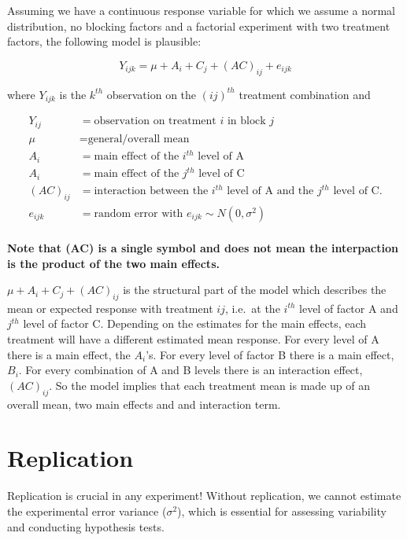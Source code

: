 \documentclass[
  letterpaper,
]{book}
\begin{document}
Assuming we have a continuous response variable for which we assume a
normal distribution, no blocking factors and a factorial experiment with
two treatment factors, the following model is plausible:

\[
Y_{ijk} = \mu + A_i + C_j + (AC)_{ij} + e_{ijk}
\]

where \(Y_{ijk}\) is the \(k^{th}\) observation on the \((ij)^{th}\)
treatment combination and

\[
\begin{aligned}
    Y_{ij} &= \text{observation on treatment } i \text{ in block } j \\
    \mu &= \text{general/overall mean} \\
    A_i &= \text{main effect of the } i^{th} \text{ level of A} \\
    A_i &= \text{main effect of the } j^{th} \text{ level of C} \\
    (AC)_{ij} &= \text{interaction between the }i^{th}\text{ level of A and the }j^{th}\text{ level of C.} \\
    e_{ijk} &= \text{random error with } e_{ijk} \sim N(0, \sigma^2) \\
\end{aligned}
\]

\textbf{Note that (AC) is a single symbol and does not mean the
interpaction is the product of the two main effects.}

\(\mu + A_i + C_j + (AC)_{ij}\) is the structural part of the model
which describes the mean or expected response with treatment \(ij\),
i.e.~at the \(i^{th}\) level of factor A and \(j^{th}\) level of factor
C. Depending on the estimates for the main effects, each treatment will
have a different estimated mean response. For every level of A there is
a main effect, the \(A_i\)'s. For every level of factor B there is a
main effect, \(B_i\). For every combination of A and B levels there is
an interaction effect, \((AC)_{ij}\). So the model implies that each
treatment mean is made up of an overall mean, two main effects and and
interaction term.

\section{Replication}\label{replication-1}

Replication is crucial in any experiment! Without replication, we cannot
estimate the experimental error variance (\(\sigma^2\)), which is
essential for assessing variability and conducting hypothesis tests.
\end{document}
